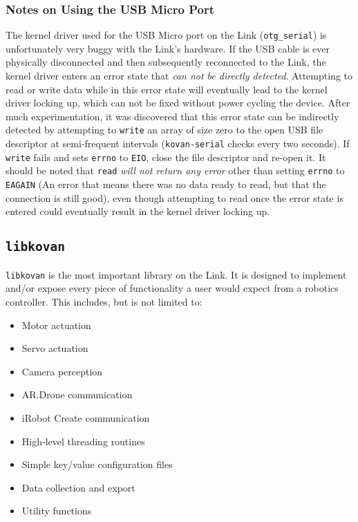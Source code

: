 \documentclass[12pt,letterpaper]{article}
\begin{document}
	\subsubsection{Notes on Using the USB Micro Port}
	The kernel driver used for the USB Micro port on the Link (\texttt{otg\_serial}) is unfortunately very buggy with the Link's hardware.
	If the USB cable is ever physically disconnected and then subsequently reconnected to the Link, the kernel driver enters an error state
	that \emph{can not be directly detected}. Attempting to read or write data while in this error state will eventually lead to the kernel
	driver locking up, which can not be fixed without power cycling the device. After much experimentation, it was discovered that this error
	state can be indirectly detected by attempting to \texttt{write} an array of size zero to the open USB file descriptor at semi-frequent
	intervals (\texttt{kovan-serial} checks every two seconds). If \texttt{write} fails and sets \texttt{errno} to \texttt{EIO}, close the
	file descriptor and re-open it. It should be noted that \texttt{read} \emph{will not return any error} other than setting \texttt{errno} to 
	\texttt{EAGAIN} (An error that means there was no data ready to read, but that the connection is still good), even though attempting to read once
	the error state is entered could eventually result in the kernel driver locking up.
	
	
	\subsection{\texttt{libkovan}}
	\texttt{libkovan} is the most important library on the Link. It is designed to implement and/or expose every piece of functionality a
	user would expect from a robotics controller. This includes, but is not limited to:
	\begin{itemize}
		\setlength{\itemsep}{0em}
		\item Motor actuation
		\item Servo actuation
		\item Camera perception
		\item AR.Drone communication
		\item iRobot Create communication
		\item High-level threading routines
		\item Simple key/value configuration files
		\item Data collection and export
		\item Utility functions
	\end{itemize}
	
\end{document}
